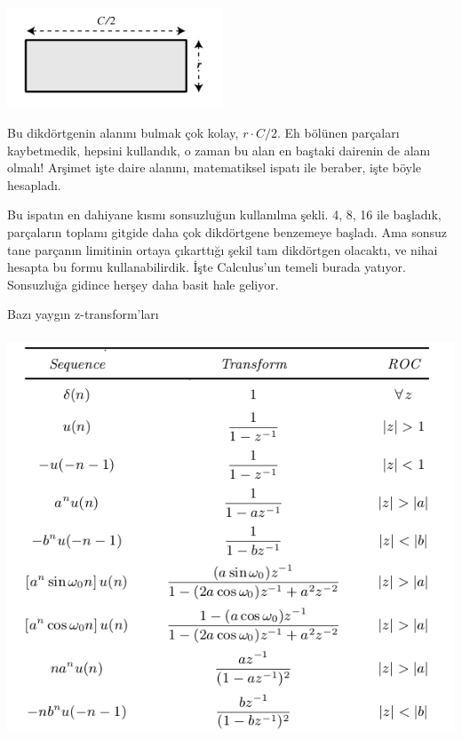 \documentclass[12pt,fleqn]{article}\usepackage{../../common}
\begin{document}
\includegraphics[height=3cm]{circ_7.png}

Bu dikdörtgenin alanını bulmak çok kolay, $r \cdot C/2$. Eh bölünen
parçaları kaybetmedik, hepsini kullandık, o zaman bu alan en baştaki
dairenin de alanı olmalı! Arşimet işte daire alanını, matematiksel ispatı
ile beraber, işte böyle hesapladı.

Bu ispatın en dahiyane kısmı sonsuzluğun kullanılma şekli. 4, 8, 16 ile
başladık, parçaların toplamı gitgide daha çok dikdörtgene benzemeye
başladı. Ama sonsuz tane parçanın limitinin ortaya çıkarttığı şekil tam
dikdörtgen olacaktı, ve nihai hesapta bu formu kullanabilirdik. İşte
Calculus'un temeli burada yatıyor. Sonsuzluğa gidince herşey daha basit
hale geliyor.


\newpage

Bazı yaygın z-transform'ları 

\includegraphics[height=12cm]{z_01.png}
\end{document}

